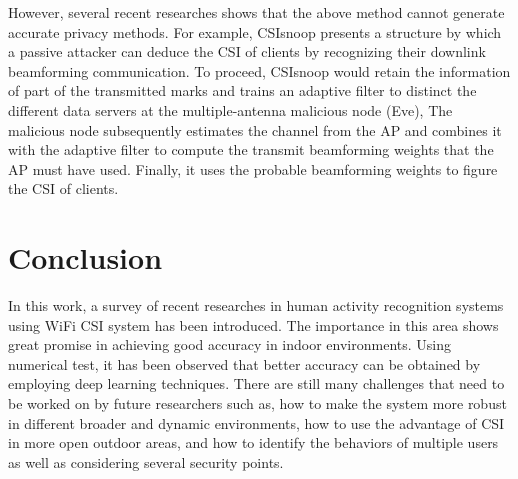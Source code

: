\documentclass[conference]{IEEEtran}
\begin{document}
However, several recent researches shows that the above method cannot generate accurate privacy methods. For example, CSIsnoop presents a structure by which a passive attacker can deduce the CSI of clients by recognizing their downlink beamforming communication. To proceed, CSIsnoop would retain the information of part of the transmitted marks and trains an adaptive filter to distinct the different data servers at the multiple-antenna malicious node (Eve), The malicious node subsequently estimates the channel from the AP and combines it with the adaptive filter to compute the transmit beamforming weights that the AP must have used. Finally, it uses the probable beamforming weights to figure the CSI of clients. 


\section{Conclusion}
In this work, a survey of recent researches in human activity recognition systems using WiFi CSI system has been introduced. The importance in this area shows great promise in achieving good accuracy in indoor environments. Using numerical test, it has been observed that better accuracy can be obtained by employing deep learning techniques. There are still many challenges that need to be worked on by future researchers such as, how to make the system more robust in different broader and dynamic environments, how to use the advantage of CSI in more open outdoor areas, and how to identify the behaviors of multiple users as well as considering several security points.
\end{document}
